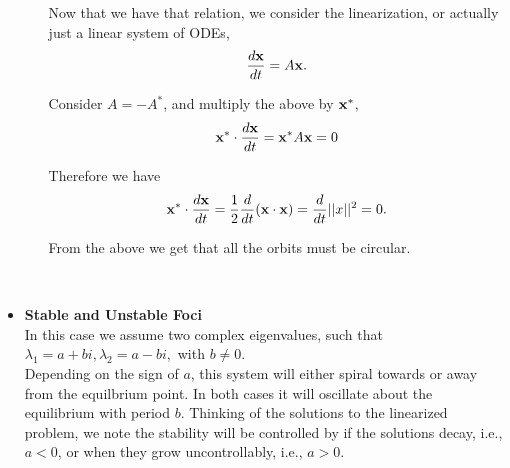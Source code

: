 \begin{itemize}
\begin{itemize}
Now that we have that relation, we consider the linearization, or actually just a linear system of ODEs,\\
$$\frac{d{\bf{x}}}{dt} = A {\bf{x}}.$$

Consider $A=-A^*$, and multiply the above by ${\bf{x}}^*$, \\

$${\bf{x}}^* \cdot \frac{d{\bf{x}}}{dt} = {\bf{x}}^* A {\bf{x}} = 0$$

Therefore we have \\

$${\bf{x}}^* \cdot \frac{d{\bf{x}}}{dt}  = \frac{1}{2} \frac{d}{dt} ( {\bf{x}}\cdot {\bf{x}} ) = \frac{d}{dt} ||x||^2 = 0.$$

From the above we get that all the orbits must be circular. \\

\end{itemize}

%

$ $\\

\item[ ] {\bf{Stable and Unstable Foci}}\\

In this case we assume two complex eigenvalues, such that $\lambda_1=a+bi,\lambda_2=a-bi,$ with $b\neq 0.$ \\ 

Depending on the sign of $a$, this system will either spiral towards or away from the equilbrium point. In both cases it will oscillate about the equilibrium with period $b$. Thinking of the solutions to the linearized problem, we note the stability will be controlled by if the solutions decay, i.e., $a<0$, or when they grow uncontrollably, i.e., $a>0.$ \\



\end{itemize}
